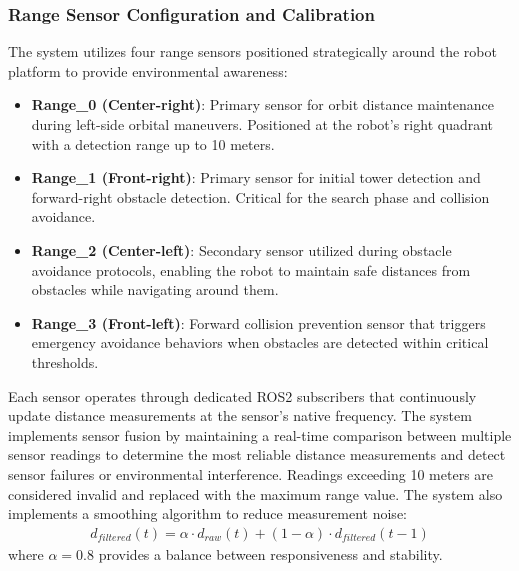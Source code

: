 \subsubsection{Range Sensor Configuration and Calibration}
The system utilizes four range sensors positioned strategically around the robot platform to provide environmental awareness:
\begin{itemize}
\item \textbf{Range\_0 (Center-right)}: Primary sensor for orbit distance maintenance during left-side orbital maneuvers. Positioned at the robot's right quadrant with a detection range up to 10 meters.
\item \textbf{Range\_1 (Front-right)}: Primary sensor for initial tower detection and forward-right obstacle detection. Critical for the search phase and collision avoidance.
\item \textbf{Range\_2 (Center-left)}: Secondary sensor utilized during obstacle avoidance protocols, enabling the robot to maintain safe distances from obstacles while navigating around them.
\item \textbf{Range\_3 (Front-left)}: Forward collision prevention sensor that triggers emergency avoidance behaviors when obstacles are detected within critical thresholds.
\end{itemize}
Each sensor operates through dedicated ROS2 subscribers that continuously update distance measurements at the sensor's native frequency. The system implements sensor fusion by maintaining a real-time comparison between multiple sensor readings to determine the most reliable distance measurements and detect sensor failures or environmental interference.
Readings exceeding 10 meters are considered invalid and replaced with the maximum range value. The system also implements a smoothing algorithm to reduce measurement noise:
\begin{align}
d_{filtered}(t) = \alpha \cdot d_{raw}(t) + (1-\alpha) \cdot d_{filtered}(t-1)
\end{align}
where $\alpha = 0.8$ provides a balance between responsiveness and stability.
